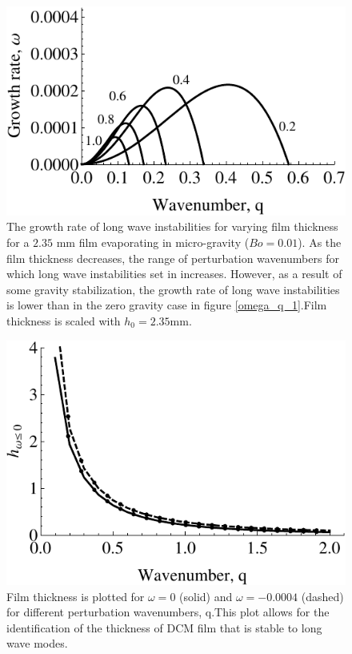 \documentclass[a4paper,12pt]{article}
\begin{document}
  \begin{figure}
   \centering
   \includegraphics[width=\linewidth]{Fig26.pdf}
   \caption{The growth rate of long wave instabilities for varying film thickness for a $2.35$ mm film evaporating in micro-gravity ($Bo=0.01$). As the film thickness decreases, the range of perturbation wavenumbers for which long wave instabilities set in increases. However, as a result of some gravity stabilization, the growth rate of long wave instabilities is lower than in the zero gravity case in figure \ref{omega_q_1}.Film thickness is scaled with $h_0=2.35$mm.}
   \label{omega_q_2}
  \end{figure}


  \begin{figure}
   \centering
   \includegraphics[width=\linewidth]{Fig27_2.pdf}
   \caption{Film thickness is plotted for $\omega=0$ (solid) and $\omega=-0.0004$ (dashed) for different perturbation wavenumbers, q.This plot allows for the identification of the thickness of DCM film that is stable to long wave modes.}
   \label{h_vs_q}
  \end{figure}
\end{document}
